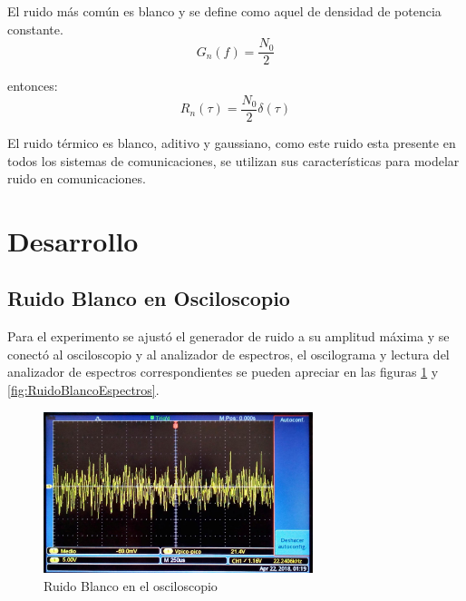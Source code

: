 \documentclass{article}
\begin{document}
El ruido más común es blanco y se define como aquel de densidad de potencia constante.\citep{Capitulo1SC}\\

\begin{equation}
    G_n(f)=\frac{N_0}{2}
\end{equation}

entonces:\\


\begin{equation}
    R_n(\tau)=\frac{N_0}{2} \delta (\tau)
\end{equation}

El ruido térmico es blanco, aditivo y gaussiano, como este ruido esta presente en todos los sistemas de comunicaciones, se utilizan sus características para modelar ruido en comunicaciones.\citep{Capitulo1SC}




\section{Desarrollo}





\subsection{Ruido Blanco en Osciloscopio}

Para el experimento se ajustó el generador de ruido a su amplitud máxima y se conectó al osciloscopio y al analizador de espectros, el oscilograma y lectura del analizador de espectros correspondientes se pueden apreciar en las figuras \ref{fig:RuidoBlanco} y \ref{fig:RuidoBlancoEspectros}.\\

\begin{figure}[h!]
    \centering
    \includegraphics[width=0.7\textwidth]{Imagenes/RuidoBlanco.jpg}
   
    \caption{Ruido Blanco en el osciloscopio}
    \label{fig:RuidoBlanco}
\end{figure}
\end{document}
